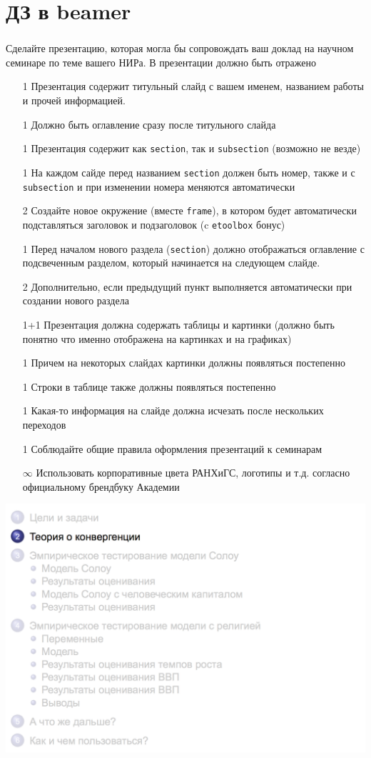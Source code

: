 \documentclass[t, dvipsnames]{beamer}  %
\begin{document}
\section{ДЗ в beamer}

\begin{frame}[shrink=20]
	\frametitle{\insertsection}	
Сделайте презентацию, которая могла бы сопровождать ваш доклад на научном семинаре по теме вашего НИРа. В презентации должно быть отражено
\begin{itemize}
	\item[1] Презентация содержит титульный слайд с вашем именем, названием работы и прочей информацией. 
	\item[1] Должно быть оглавление сразу после титульного слайда 
	\item[1] Презентация содержит как \verb"section", так и \verb"subsection" (возможно не везде)
	\item[1] На каждом сайде перед названием \verb"section" должен быть номер, также и с \verb"subsection" и при изменении номера меняются автоматически  
	\item[2] Создайте новое окружение (вместе \verb"frame"), в котором будет автоматически подставляться заголовок и подзаголовок (c \verb"etoolbox" бонус)
	\item[1] Перед началом нового раздела (\verb"section") должно отображаться оглавление с подсвеченным разделом, который начинается на следующем слайде. 
	\item[2] Дополнительно, если предыдущий пункт выполняется автоматически при создании нового раздела 
	\item[1+1] Презентация должна содержать таблицы и картинки (должно быть понятно что именно отображена на картинках и на графиках) 
	\item[1] Причем на некоторых слайдах картинки должны появляться постепенно
	\item[1] Строки в таблице также должны появляться постепенно
	\item[1] Какая-то информация на слайде должна исчезать после нескольких переходов 
	\item[1] Соблюдайте общие правила оформления презентаций к семинарам 	
	\item[$\infty$] Использовать корпоративные цвета РАНХиГС, логотипы и т.\:д. согласно официальному брендбуку Академии
	\end{itemize}
\end{frame}



\begin{frame}[plain]
\includegraphics[width=\paperwidth]{hw} 
\end{frame}
\end{document}
